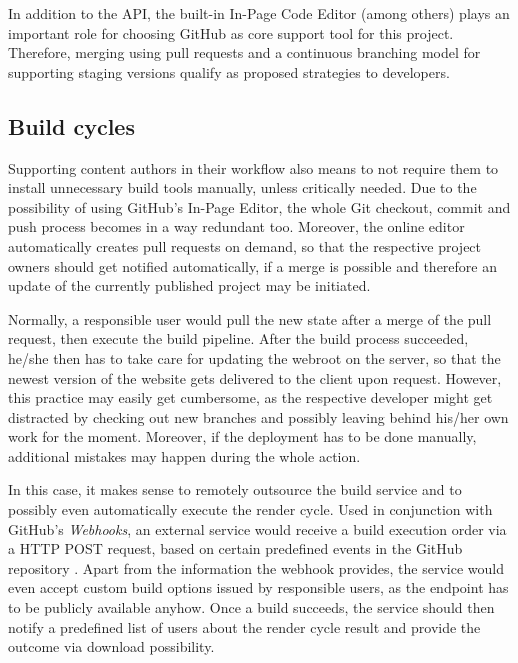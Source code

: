 In addition to the API, the built-in In-Page Code Editor (among others) plays an important role for choosing GitHub as core support tool for this project. Therefore, merging using pull requests and a continuous branching model for supporting staging versions qualify as proposed strategies to developers.


\subsection{Build cycles}
\label{sec:solutions-remotebuilding}

Supporting content authors in their workflow also means to not require them to install unnecessary build tools manually, unless critically needed. Due to the possibility of using GitHub's In-Page Editor, the whole Git checkout, commit and push process becomes in a way redundant too. Moreover, the online editor automatically creates pull requests on demand, so that the respective project owners should get notified automatically, if a merge is possible and therefore an update of the currently published project may be initiated.

Normally, a responsible user would pull the new state after a merge of the pull request, then execute the build pipeline. After the build process succeeded, he/she then has to take care for updating the webroot on the server, so that the newest version of the website gets delivered to the client upon request. However, this practice may easily get cumbersome, as the respective developer might get distracted by checking out new branches and possibly leaving behind his/her own work for the moment. Moreover, if the deployment has to be done manually, additional mistakes may happen during the whole action.

In this case, it makes sense to remotely outsource the build service and to possibly even automatically execute the render cycle. Used in conjunction with GitHub's \emph{Webhooks}, an external service would receive a build execution order via a HTTP POST request, based on certain predefined events in the GitHub repository \cite{GithubWebhooks}. Apart from the information the webhook provides, the service would even accept custom build options issued by responsible users, as the endpoint has to be publicly available anyhow. Once a build succeeds, the service should then notify a predefined list of users about the render cycle result and provide the outcome via download possibility.

